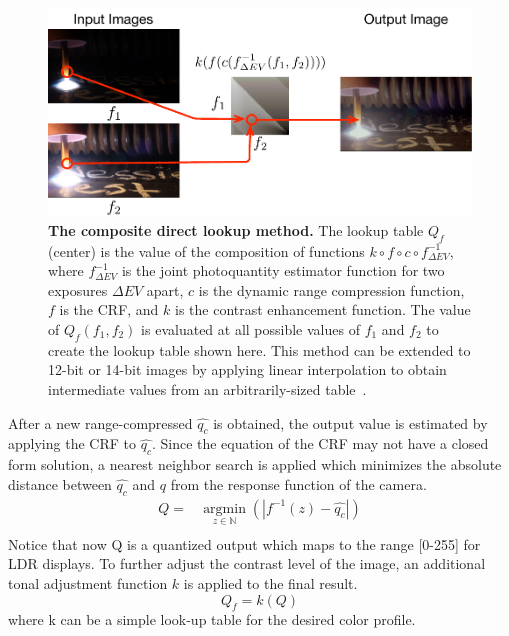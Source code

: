 \begin{figure}
\center
 \includegraphics[width=13cm]{ch3/diagrams/direct_lut_method.pdf}
 \caption{\textbf{The composite direct lookup method.} The lookup table $Q_f$ (center) is the value of 
the composition of functions $ k \circ f \circ c \circ f^{-1}_{\Delta EV} $, where  $ f^{-1}_{\Delta EV} $ is 
the joint photoquantity estimator function for two exposures $ {\Delta EV} $ apart, $c$ is the dynamic 
range compression function, $f$ is the CRF, and $k$ is the contrast enhancement function. The value 
of $Q_f (f_1, f_2)$ is evaluated at all possible values of $f_1$ and $f_2$ to create the lookup table 
shown here. This method can be extended to 12-bit or 14-bit images by applying linear interpolation 
to obtain intermediate values from an arbitrarily-sized table~\cite{mann2012realtime}.}
 \label{cdlut}
\end{figure}

After a new range-compressed $\hat{q_c}$ is obtained, the output value is estimated by applying the 
CRF to 
$\hat{q_c}$. Since the equation of the CRF may not have a closed form
solution, a nearest neighbor search is applied which
minimizes the absolute distance between $\hat{q_c}$ and $q$
from the response function of the camera.
\begin{equation}
\begin{aligned}
Q = & \underset{z\in \mathbb{N}}{\operatorname{argmin}}{(|f^{-1}(z)-\hat{q_c}|)} \\
\end{aligned}
\label{opt_min}
\end{equation}
Notice that now Q is a quantized output which maps to the range
[0-255] for LDR displays. To further adjust the contrast level of the
image, an additional tonal adjustment function $k$ is applied to
the final result.  
% 
\begin{equation}\label{contrast_enhancement}
 Q_f=k(Q)
\end{equation}
where k can be a simple look-up table for the desired color profile.


